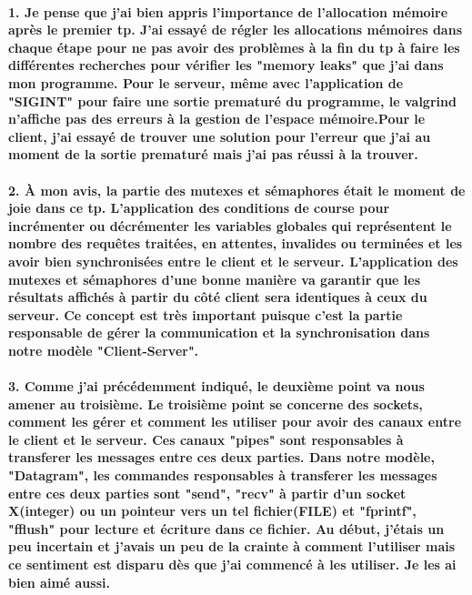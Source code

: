 \documentclass{article}
\begin{document}
\paragraph{1. Je pense que j'ai bien appris l'importance de l'allocation mémoire après le premier tp. J'ai essayé de régler les allocations mémoires dans chaque étape pour ne pas avoir des problèmes à la fin du tp à faire les différentes recherches pour vérifier les "memory leaks" que j'ai dans mon programme. Pour le serveur, même avec l'application de "SIGINT" pour faire une sortie prematuré du programme, le valgrind n'affiche pas des erreurs à la gestion de l'espace mémoire.\newline Pour le client, j'ai essayé de trouver une solution pour l'erreur que j'ai au moment de la sortie prematuré mais j'ai pas réussi à la trouver.}

\paragraph{2. À mon avis, la partie des mutexes et sémaphores était le moment de joie dans ce tp. L'application des conditions de course pour incrémenter ou décrémenter les variables globales qui représentent le nombre des requêtes traitées, en attentes, invalides ou terminées et les avoir bien synchronisées entre le client et le serveur. L'application des mutexes et sémaphores d'une bonne manière va garantir que les résultats affichés à partir du côté client sera identiques à ceux du serveur. Ce concept est très important puisque c'est la partie responsable de gérer la communication et la synchronisation dans notre modèle "Client-Server".}

\paragraph{3. Comme j'ai précédemment indiqué, le deuxième point va nous amener au troisième. Le troisième point se concerne des sockets, comment les gérer et comment les utiliser pour avoir des canaux entre le client et le serveur. Ces canaux "pipes" sont responsables à transferer les messages entre ces deux parties. Dans notre modèle, "Datagram", les commandes responsables à transferer les messages entre ces deux parties sont "send", "recv" à partir d'un socket X(integer) ou un pointeur vers un tel fichier(FILE) et "fprintf", "fflush" pour lecture et écriture dans ce fichier. Au début, j'étais un peu incertain et j'avais un peu de la crainte à comment l'utiliser mais ce sentiment est disparu dès que j'ai commencé à les utiliser. Je les ai bien aimé aussi.}
\end{document}
